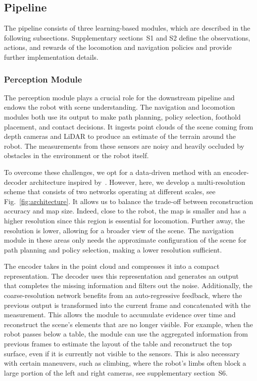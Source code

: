 \documentclass[conference]{IEEEtran}
\begin{document}
\subsection{Pipeline}

The pipeline consists of three learning-based modules, which are described in the following subsections. Supplementary sections~S1 and S2 define the observations, actions, and rewards of the locomotion and navigation policies and provide further implementation details.

\subsubsection{Perception Module}

The perception module plays a crucial role for the downstream pipeline and endows the robot with scene understanding. The navigation and locomotion modules both use its output to make path planning, policy selection, foothold placement, and contact decisions.
It ingests point clouds of the scene coming from depth cameras and LiDAR to produce an estimate of the terrain around the robot. The measurements from these sensors are noisy and heavily occluded by obstacles in the environment or the robot itself.

To overcome these challenges, we opt for a data-driven method with an encoder-decoder architecture inspired by~\cite{hoeller2022TREP}. However, here, we develop a multi-resolution scheme that consists of two networks operating at different scales, see Fig.~\ref{fig:architecture}. It allows us to balance the trade-off between reconstruction accuracy and map size. Indeed, close to the robot, the map is smaller and has a higher resolution since this region is essential for locomotion. Further away, the resolution is lower, allowing for a broader view of the scene. The navigation module in these areas only needs the approximate configuration of the scene for path planning and policy selection, making a lower resolution sufficient.

The encoder takes in the point cloud and compresses it into a compact representation. The decoder uses this representation and generates an output that completes the missing information and filters out the noise.
Additionally, the coarse-resolution network benefits from an auto-regressive feedback, where the previous output is transformed into the current frame and concatenated with the measurement. This allows the module to accumulate evidence over time and reconstruct the scene's elements that are no longer visible. For example, when the robot passes below a table, the module can use the aggregated information from previous frames to estimate the layout of the table and reconstruct the top surface, even if it is currently not visible to the sensors. This is also necessary with certain maneuvers, such as climbing, where the robot's limbs often block a large portion of the left and right cameras, see supplementary section~S6.
\end{document}
